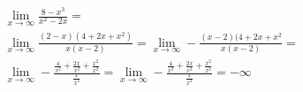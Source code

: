 \begin{ex}
\begin{align}
&\lim_{x\rightarrow \infty} \frac{8-x^3}{x^2-2x}=\nonumber\\
&\lim_{x\rightarrow \infty} \frac{(2-x)(4+2x+x^2)}{x(x-2)}=\lim_{x\rightarrow \infty} -\frac{(x-2)(4+2x+x^2}{x(x-2)}=\nonumber\\
&\lim_{x\rightarrow \infty} -\frac{\frac{4}{x^2}+\frac{2x}{x^2}+\frac{x^2}{x^2}}{\frac{x}{x^2}}=\lim_{x\rightarrow \infty} -\frac{\frac{4}{x^2}+\frac{2x}{x^2}+\frac{x^2}{x^2}}{\frac{x}{x^2}}=-{\infty}\nonumber
\end{align}
\end{ex}